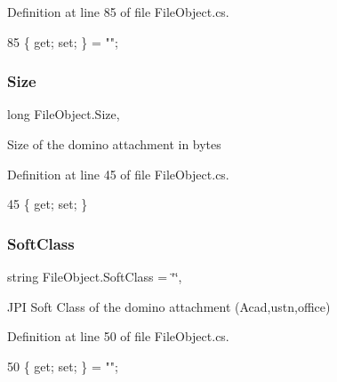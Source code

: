 Definition at line 85 of file File\+Object.\+cs.


\begin{DoxyCode}
85 \{ \textcolor{keyword}{get}; \textcolor{keyword}{set}; \} = \textcolor{stringliteral}{""};
\end{DoxyCode}
\mbox{\label{class_file_object_a7aa7737c1ce05f4424ba16dded444949}} 
\subsubsection{\texorpdfstring{Size}{Size}}
{\footnotesize\ttfamily long File\+Object.\+Size\hspace{0.3cm}{\ttfamily [get]}, {\ttfamily [set]}}



Size of the domino attachment in bytes 



Definition at line 45 of file File\+Object.\+cs.


\begin{DoxyCode}
45 \{ \textcolor{keyword}{get}; \textcolor{keyword}{set}; \}
\end{DoxyCode}
\mbox{\label{class_file_object_a5e9b8f083b53ea0450a0560c16292a2f}} 
\subsubsection{\texorpdfstring{Soft\+Class}{SoftClass}}
{\footnotesize\ttfamily string File\+Object.\+Soft\+Class = \char`\"{}\char`\"{}\hspace{0.3cm}{\ttfamily [get]}, {\ttfamily [set]}}



J\+PI Soft Class of the domino attachment (Acad,ustn,office) 



Definition at line 50 of file File\+Object.\+cs.


\begin{DoxyCode}
50 \{ \textcolor{keyword}{get}; \textcolor{keyword}{set}; \} = \textcolor{stringliteral}{""};
\end{DoxyCode}
\mbox{\label{class_file_object_a7355eaeea3fe40bd8862d7f1f9b479da}} 
